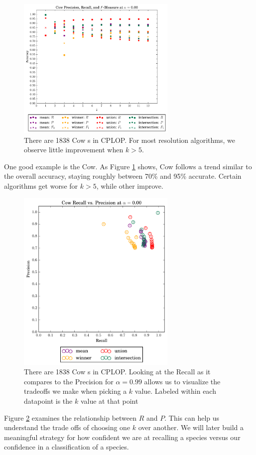 \begin{figure}[t]
\centering
\includegraphics[width=3in]{figures/krap/Cow-ALL-metrics-12-0_000}
\caption{There are 1838 Cow \isol{}s in CPLOP. For most resolution algorithms, we observe little improvement when $k>5$.}
\label{fig:k_cow}
\end{figure}
One good example is the Cow. As Figure \ref{fig:k_cow} shows, Cow follows a trend similar to the overall accuracy, staying roughly between 70\% and 95\% accurate. Certain algorithms get worse for $k>5$, while other improve.

\begin{figure}[t]
\centering
\includegraphics[width=3in]{figures/krap/Cow-ALL-pvr-12-0_000}
\caption{There are 1838 Cow \isol{}s in CPLOP. Looking at the Recall as it compares to the Precision for $\alpha=0.99$ allows us to visualize the tradeoffs we make when picking a $k$ value. Labeled within each datapoint is the $k$ value at that point}
\label{fig:k_cow_pvr}
\end{figure}
Figure \ref{fig:k_cow_pvr} examines the relationship between $R$ and $P$. This can help us understand the trade offs of choosing one $k$ over another. We will later build a meaningful strategy for how confident we are at recalling a species versus our confidence in a classification of a species.


